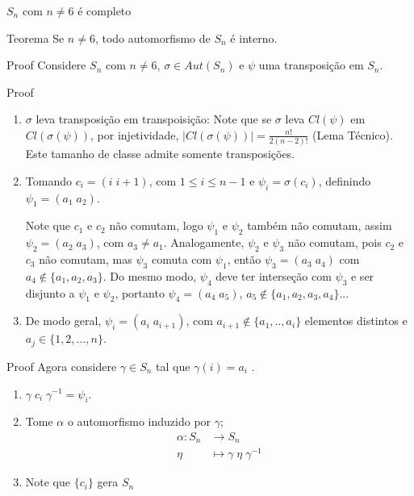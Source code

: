 
\begin{frame}{$S_n$ com $n \neq 6$ é completo}
\begin{block}{Teorema}
    Se $n \neq 6$, todo automorfismo de $S_n$ é interno.
\end{block}
     \begin{block}{Proof}
        Considere $S_n $ com $n \neq 6 $, $\sigma \in Aut(S_n)$ e $\psi$ uma transposição em $S_n$.
    \end{block}
\end{frame}

\begin{frame}{}
    \begin{block}{Proof}
      \begin{enumerate}
          \item $\sigma$ leva transposição em transpoisição: Note que se $\sigma$  leva $Cl(\psi)$ em $Cl(\sigma(\psi))$, por injetividade, $ \big| Cl(\sigma(\psi)) \big| = \frac{n !}{2(n-2)!}$ (Lema Técnico). Este tamanho de classe  admite somente transposições.  
          \item Tomando $c_i = (i \; i+1)$, com $1 \leq i \leq n-1$ e $\psi_i= \sigma (c_i)$, definindo $\psi_1=(a_1 \; a_2)$. 

Note que $c_1$ e $c_2$ não comutam, logo $\psi_1$ e $\psi_2$  também não comutam, assim $\psi_2 = (a_2 \; a_3)$, com $a_3 \neq a_1$. Analogamente, $\psi_2$ e $\psi_3$ não comutam, pois  $c_2$ e $c_3$ não comutam, mas  $\psi_3$ comuta com $\psi_1$, então $\psi_3= (a_3 \; a_4)$ com $a_4 \notin \{a_1,a_2,a_3\} $. Do mesmo modo, $\psi_4$ deve ter interseção com $\psi_3$ e ser disjunto a $\psi_1$ e $\psi_2$, portanto $\psi_4 = (a_4\; a_5)$, $a_5 \notin \{a_1,a_2,a_3, a_4\} $...
\item De modo geral, $\psi_i = (a_i \; a_{i+1})$, com $a_{i+1} \notin \{a_1,..,a_i\} $ elementos distintos e  $a_j \in \{1,2,...,n\}$.
 
      \end{enumerate}
    \end{block}
    
\end{frame}
\begin{frame}{}
\begin{block}{Proof}
Agora considere $\gamma \in S_n$ tal que $\gamma(i)=a_i$ .
\begin{enumerate}
    \item  $\gamma \; c_i \; \gamma^{-1} = \psi_i$.
    \item   Tome $\alpha$  o automorfismo induzido por $\gamma$; 
\[
\begin{aligned}
\alpha : S_n &\longrightarrow S_n\\
\eta &\longmapsto \gamma \; \eta \;\gamma^{-1}
\end{aligned}
\]
\item Note que $\{c_i\}$ gera $S_n$


\end{enumerate}
    
\end{block}
    
\end{frame}
